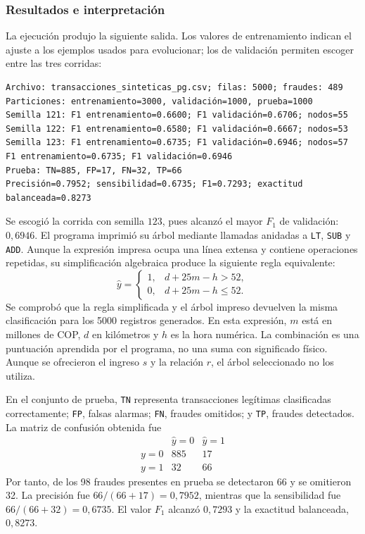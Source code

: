 \documentclass[14pt,twoside]{article}
\begin{document}
\subsubsection{Resultados e interpretación}

La ejecución produjo la siguiente salida. Los valores de entrenamiento indican el ajuste a los ejemplos usados para evolucionar; los de validación permiten escoger entre las tres corridas:

\begin{lstlisting}[style=pgterminal,caption={Resultados de las tres corridas y evaluación final.}]
Archivo: transacciones_sinteticas_pg.csv; filas: 5000; fraudes: 489
Particiones: entrenamiento=3000, validación=1000, prueba=1000
Semilla 121: F1 entrenamiento=0.6600; F1 validación=0.6706; nodos=55
Semilla 122: F1 entrenamiento=0.6580; F1 validación=0.6667; nodos=53
Semilla 123: F1 entrenamiento=0.6735; F1 validación=0.6946; nodos=57
F1 entrenamiento=0.6735; F1 validación=0.6946
Prueba: TN=885, FP=17, FN=32, TP=66
Precisión=0.7952; sensibilidad=0.6735; F1=0.7293; exactitud balanceada=0.8273
\end{lstlisting}

Se escogió la corrida con semilla \(123\), pues alcanzó el mayor \(F_1\) de validación: \(0{,}6946\). El programa imprimió su árbol mediante llamadas anidadas a \texttt{LT}, \texttt{SUB} y \texttt{ADD}. Aunque la expresión impresa ocupa una línea extensa y contiene operaciones repetidas, su simplificación algebraica produce la siguiente regla equivalente:
\[
\widehat{y}=
\begin{cases}
1,&d+25m-h>52,\\
0,&d+25m-h\leq52.
\end{cases}
\]
Se comprobó que la regla simplificada y el árbol impreso devuelven la misma clasificación para los 5000 registros generados. En esta expresión, \(m\) está en millones de COP, \(d\) en kilómetros y \(h\) es la hora numérica. La combinación es una puntuación aprendida por el programa, no una suma con significado físico. Aunque se ofrecieron el ingreso \(s\) y la relación \(r\), el árbol seleccionado no los utiliza.

En el conjunto de prueba, \texttt{TN} representa transacciones legítimas clasificadas correctamente; \texttt{FP}, falsas alarmas; \texttt{FN}, fraudes omitidos; y \texttt{TP}, fraudes detectados. La matriz de confusión obtenida fue
\[
\begin{array}{c|cc}
&\widehat{y}=0&\widehat{y}=1\\ \hline
y=0&885&17\\
y=1&32&66
\end{array}
\]
Por tanto, de los 98 fraudes presentes en prueba se detectaron 66 y se omitieron 32. La precisión fue \(66/(66+17)=0{,}7952\), mientras que la sensibilidad fue \(66/(66+32)=0{,}6735\). El valor \(F_1\) alcanzó \(0{,}7293\) y la exactitud balanceada, \(0{,}8273\).
\end{document}
